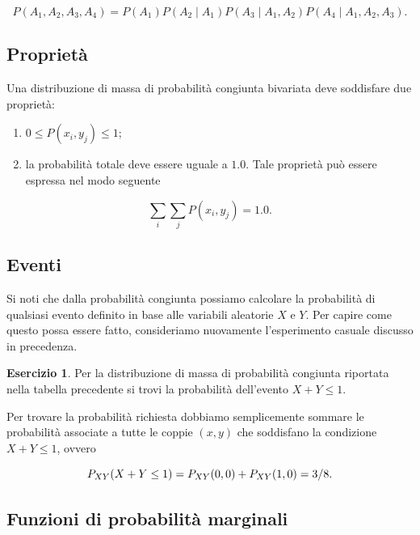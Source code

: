 \documentclass[
  11pt,
]{krantz}
\theoremstyle{definition}
\theoremstyle{definition}
\theoremstyle{definition}
\newtheorem{exercise}{Esercizio}[chapter]
\theoremstyle{definition}
\theoremstyle{remark}
\begin{document}
\[
P(A_1, A_2, A_3, A_4) = P(A_1) P(A_2 \mid A_1) P(A_3 \mid A_1, A_2) P(A_4 \mid A_1, A_2, A_3).
\]

\hypertarget{proprietuxe0}{%
\subsection{Proprietà}\label{proprietuxe0}}

Una distribuzione di massa di probabilità congiunta bivariata deve soddisfare due proprietà:

\begin{enumerate}
\def\labelenumi{\arabic{enumi}.}
\item
  \(0 \leq P(x_i, y_j) \leq 1\);
\item
  la probabilità totale deve essere uguale a \(1.0\). Tale proprietà può essere espressa nel modo seguente
\end{enumerate}

\[
\sum_{i} \sum_{j} P(x_i, y_j) = 1.0.
\]

\hypertarget{eventi}{%
\subsection{Eventi}\label{eventi}}

Si noti che dalla probabilità congiunta possiamo calcolare la probabilità di qualsiasi evento definito in base alle variabili aleatorie \(X\) e \(Y\). Per capire come questo possa essere fatto, consideriamo nuovamente l'esperimento casuale discusso in precedenza.

\begin{exercise}
Per la distribuzione di massa di probabilità congiunta riportata nella tabella precedente si trovi la probabilità dell'evento \(X+Y \leq 1\).

Per trovare la probabilità richiesta dobbiamo semplicemente sommare le probabilità associate a tutte le coppie \((x,y)\) che soddisfano la condizione \(X+Y \leq 1\), ovvero

\begin{equation}
P_{XY}(X+Y \leq 1) = P_{XY}(0, 0) + P_{XY}(1, 0)= 3/8.\notag
\end{equation}
\end{exercise}

\hypertarget{sec:marg-distr-discr}{%
\subsection{Funzioni di probabilità marginali}\label{sec:marg-distr-discr}}
\end{document}
